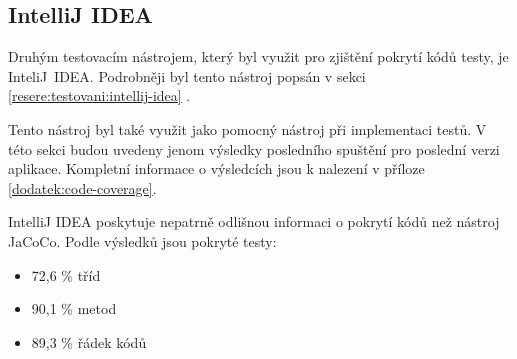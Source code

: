     \subsection{IntelliJ IDEA}
    Druhým testovacím nástrojem, který byl využit pro zjištění pokrytí kódů testy, je InteliJ~IDEA. Podrobněji byl tento nástroj popsán v sekci \ref{resere:testovani:intellij-idea} . 
    
    Tento nástroj byl také využit jako pomocný nástroj při implementaci testů. V této sekci budou uvedeny jenom výsledky posledního spuštění pro poslední verzi aplikace. Kompletní informace o výsledcích jsou k nalezení v příloze \ref{dodatek:code-coverage}.
    
    IntelliJ IDEA poskytuje nepatrně odlišnou informaci o pokrytí kódů než nástroj JaCoCo. Podle výsledků jsou pokryté testy:
    \begin{itemize}
            \item 72,6 \% tříd
            \item 90,1 \% metod
            \item 89,3 \% řádek kódů
    \end{itemize}